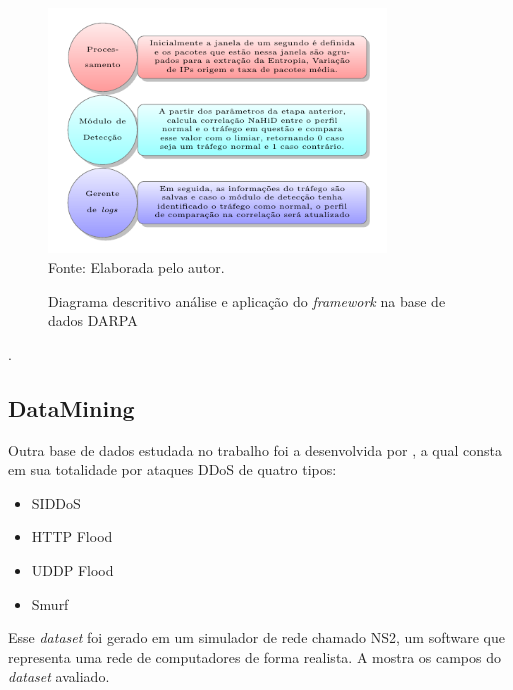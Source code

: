  \begin{figure}[!ht]
 	\centering
 	\caption{Diagrama descritivo análise e aplicação do \textit{framework} na base de dados DARPA  }
 	\includegraphics[width=0.8\textwidth]{figs/analiseDarpa.pdf}\\
 	{Fonte: Elaborada pelo autor.}
 	\label{fig:analiseDarpa}
 \end{figure}

.
\subsection{DataMining}
Outra base de dados estudada no trabalho foi a desenvolvida por \cite{DataMining}, a qual consta em sua totalidade por ataques DDoS de quatro tipos:
\begin{itemize}
	\item SIDDoS
	\item HTTP Flood
	\item UDDP Flood
	\item Smurf
\end{itemize}
Esse \textit{dataset} foi gerado em um simulador de rede chamado NS2, um software que representa uma rede de computadores de forma realista. 
A  mostra os campos do \textit{dataset} avaliado. 

